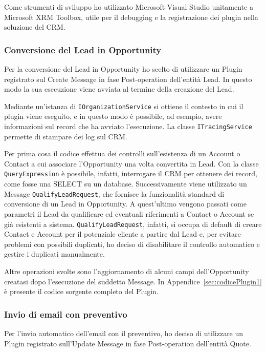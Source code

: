 Come strumenti di sviluppo ho utilizzato Microsoft Visual Studio unitamente a Microsoft XRM Toolbox, utile per il debugging e la registrazione dei plugin nella soluzione del CRM.

\subsubsection{Conversione del Lead in Opportunity}
\label{ssec:conversioneLead}
Per la conversione del Lead in Opportunity ho scelto di utilizzare un Plugin registrato sul Create Message in fase Post-operation dell'entità Lead. In questo modo la sua esecuzione viene avviata al termine della creazione del Lead.

Mediante un'istanza di \lstinline[language={[Sharp]C}]{IOrganizationService} si ottiene il contesto in cui il plugin viene eseguito, e in questo modo è possibile, ad esempio, avere informazioni sul record che ha avviato l'esecuzione. La classe \lstinline[language={[Sharp]C}]{ITracingService} permette di stampare dei log sul CRM. 

Per prima cosa il codice effettua dei controlli sull'esistenza di un Account o Contact a cui associare l'Opportunity una volta convertita in Lead. Con la classe \lstinline[language={[Sharp]C}]{QueryExpression} è possibile, infatti, interrogare il CRM per ottenere dei record, come fosse una SELECT su un database. 
Successivamente viene utilizzato un Message \lstinline[language={[Sharp]C}]{QualifyLeadRequest}, che fornisce la funzionalità standard di conversione di un Lead in Opportunity. A quest'ultimo vengono passati come parametri il Lead da qualificare ed eventuali riferimenti a Contact o Account se già esistenti a sistema. \lstinline[language={[Sharp]C}]{QualifyLeadRequest}, infatti, si occupa di default di creare Contact e Account per il potenziale cliente a partire dal Lead e, per evitare problemi con possibili duplicati, ho deciso di disabilitare il controllo automatico e gestire i duplicati manualmente.

Altre operazioni svolte sono l'aggiornamento di alcuni campi dell'Opportunity creatasi dopo l'esecuzione del suddetto Message. In Appendice~\ref{sec:codicePlugin1} è presente il codice sorgente completo del Plugin.

\subsubsection{Invio di email con preventivo}
\label{ssec:invioEmail}
Per l'invio automatico dell'email con il preventivo, ho deciso di utilizzare un Plugin registrato sull'Update Message in fase Post-operation dell'entità Quote. 

